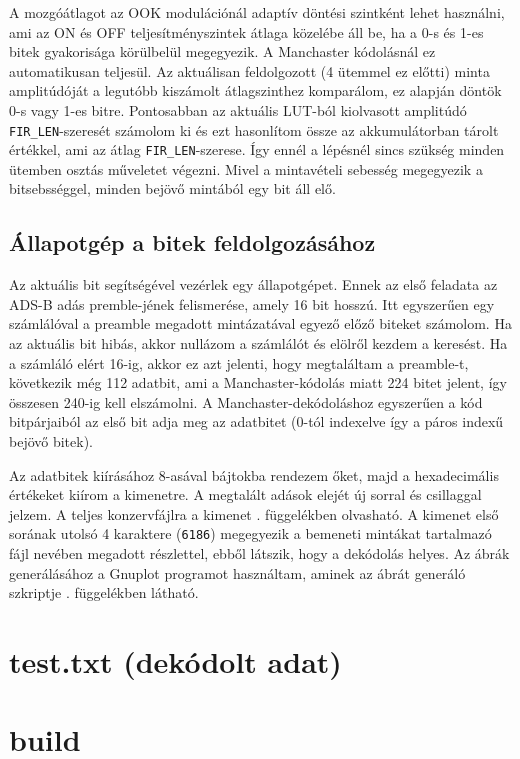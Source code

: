         A mozgóátlagot az OOK modulációnál adaptív döntési szintként lehet használni, ami az ON és OFF teljesítményszintek átlaga közelébe áll be, ha a 0-s és 1-es bitek gyakorisága körülbelül megegyezik. A Manchaster kódolásnál ez automatikusan teljesül. Az aktuálisan feldolgozott (4 ütemmel ez előtti) minta amplitúdóját a legutóbb kiszámolt átlagszinthez komparálom, ez alapján döntök 0-s vagy 1-es bitre. Pontosabban az aktuális LUT-ból kiolvasott amplitúdó \verb|FIR_LEN|-szeresét számolom ki és ezt hasonlítom össze az akkumulátorban tárolt értékkel, ami az átlag \verb|FIR_LEN|-szerese. Így ennél a lépésnél sincs szükség minden ütemben osztás műveletet végezni. Mivel a mintavételi sebesség megegyezik a bitsebsséggel, minden bejövő mintából egy bit áll elő.
    \subsection{Állapotgép a bitek feldolgozásához}
        Az aktuális bit segítségével vezérlek egy állapotgépet. Ennek az első feladata az ADS-B adás premble-jének felismerése, amely 16 bit hosszú. Itt egyszerűen egy számlálóval a preamble megadott mintázatával egyező előző biteket számolom. Ha az aktuális bit hibás, akkor nullázom a számlálót és elölről kezdem a keresést. Ha a számláló elért 16-ig, akkor ez azt jelenti, hogy megtaláltam a preamble-t, következik még 112 adatbit, ami a Manchaster-kódolás miatt 224 bitet jelent, így összesen 240-ig kell elszámolni. A Manchaster-dekódoláshoz egyszerűen a kód bitpárjaiból az első bit adja meg az adatbitet (0-tól indexelve így a páros indexű bejövő bitek).

        Az adatbitek kiírásához 8-asával bájtokba rendezem őket, majd a hexadecimális értékeket kiírom a kimenetre. A megtalált adások elejét új sorral és csillaggal jelzem. A teljes konzervfájlra a kimenet . függelékben olvasható. A kimenet első sorának utolsó 4 karaktere (\verb|6186|) megegyezik a bemeneti mintákat tartalmazó fájl nevében megadott részlettel, ebből látszik, hogy a dekódolás helyes. Az ábrák generálásához a Gnuplot programot használtam, aminek az ábrát generáló szkriptje . függelékben látható.
%
%
%
\clearpage
\appendix
%
\section{test.txt (dekódolt adat)}
    \label{test.txt}
	
\section{build}
	
